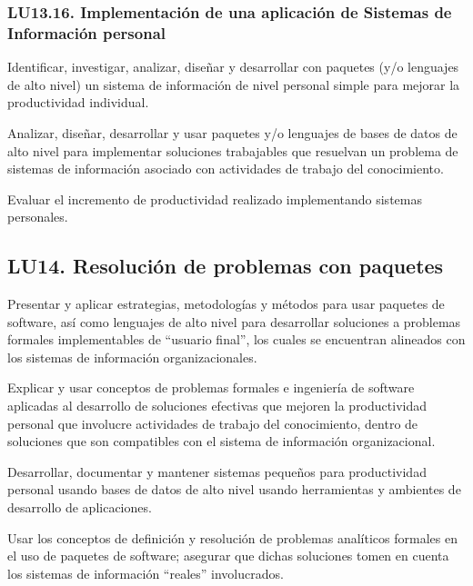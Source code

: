 \subsubsection{LU13.16. Implementación de una aplicación de Sistemas de Información personal}\label{sec:BOK-LU13.16}\label{sec:LU13.16}
\begin{LearningUnit}
\begin{LUGoal}
\item Identificar, investigar, analizar, diseñar y desarrollar con paquetes (y/o lenguajes de alto nivel) un sistema de información de nivel personal simple para mejorar la productividad individual.
\end{LUGoal}

\begin{LUObjective}
\item Analizar, diseñar, desarrollar y usar paquetes y/o lenguajes de bases de datos de alto nivel para implementar soluciones trabajables que resuelvan un problema de sistemas de información asociado con actividades de trabajo del conocimiento.
\item Evaluar el incremento de productividad realizado implementando sistemas personales.
\end{LUObjective}
\end{LearningUnit}

\subsection{LU14. Resolución de problemas con paquetes}\label{sec:BOK-LU14}\label{sec:LU14}
\begin{LearningUnit}
\begin{LUGoal}
\item Presentar y aplicar estrategias, metodologías y métodos para usar paquetes de software, así como lenguajes de alto nivel para desarrollar soluciones a problemas formales implementables de ``usuario final'', los cuales se encuentran alineados con los sistemas de información organizacionales.
\end{LUGoal}

\begin{LUObjective}
\item Explicar y usar conceptos de problemas formales e ingeniería de software aplicadas al desarrollo de soluciones efectivas que mejoren la productividad personal que involucre actividades de trabajo del conocimiento, dentro de soluciones que son compatibles con el sistema de información organizacional.
\item Desarrollar, documentar y mantener sistemas pequeños para productividad personal usando bases de datos de alto nivel usando herramientas y ambientes de desarrollo de aplicaciones.
\item Usar los conceptos de definición y resolución de problemas analíticos formales en el uso de paquetes de software; asegurar que dichas soluciones tomen en cuenta los sistemas de información ``reales'' involucrados.
\end{LUObjective}
\end{LearningUnit}

